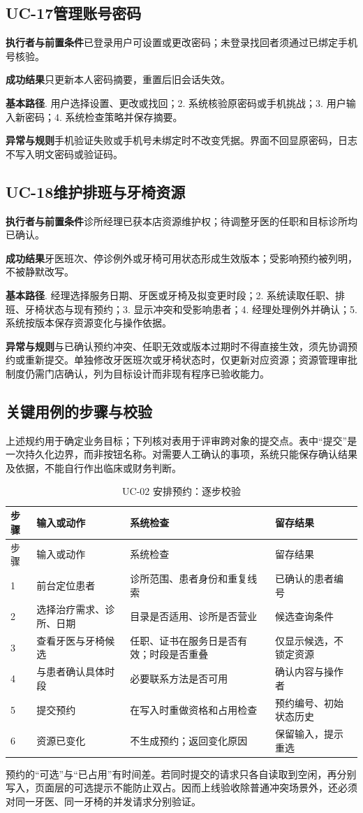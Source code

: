 \documentclass[12pt,a4paper,fontset=windows]{ctexart}
\newcommand{\spec}[6]{\Needspace{10\baselineskip}\subsection{#1\quad #2}
  \noindent\textbf{执行者与前置条件}\quad #3\par
  \noindent\textbf{成功结果}\quad #4\par
  \noindent\textbf{基本路径}\quad #5\par
  \noindent\textbf{异常与规则}\quad #6\par}
\begin{document}
\spec{UC-17}{管理账号密码}
{已登录用户可设置或更改密码；未登录找回者须通过已绑定手机号核验。}
{只更新本人密码摘要，重置后旧会话失效。}
{1. 用户选择设置、更改或找回；2. 系统核验原密码或手机挑战；3. 用户输入新密码；4. 系统检查策略并保存摘要。}
{手机验证失败或手机号未绑定时不改变凭据。界面不回显原密码，日志不写入明文密码或验证码。}

\spec{UC-18}{维护排班与牙椅资源}
{诊所经理已获本店资源维护权；待调整牙医的任职和目标诊所均已确认。}
{牙医班次、停诊例外或牙椅可用状态形成生效版本；受影响预约被列明，不被静默改写。}
{1. 经理选择服务日期、牙医或牙椅及拟变更时段；2. 系统读取任职、排班、牙椅状态与现有预约；3. 显示冲突和受影响患者；4. 经理处理例外并确认；5. 系统按版本保存资源变化与操作依据。}
{与已确认预约冲突、任职无效或版本过期时不得直接生效，须先协调预约或重新提交。单独修改牙医班次或牙椅状态时，仅更新对应资源；资源管理审批制度仍需门店确认，列为目标设计而非现有程序已验收能力。}

\subsection{关键用例的步骤与校验}
上述规约用于确定业务目标；下列核对表用于评审跨对象的提交点。表中“提交”是一次持久化边界，而非按钮名称。对需要人工确认的事项，系统只能保存确认结果及依据，不能自行作出临床或财务判断。

\begin{longtable}{@{}C{12mm}L{46mm}L{51mm}L{41mm}@{}}
\caption{UC-02 安排预约：逐步校验}\label{tab:booking-check}\\\toprule
步骤 & 输入或动作 & 系统检查 & 留存结果\\\midrule\endfirsthead
\toprule 步骤 & 输入或动作 & 系统检查 & 留存结果\\\midrule{} & 前台定位患者 & 诊所范围、患者身份和重复线索 & 已确认的患者编号\\
2 & 选择治疗需求、诊所、日期 & 目录是否适用、诊所是否营业 & 候选查询条件\\
3 & 查看牙医与牙椅候选 & 任职、证书在服务日是否有效；时段是否重叠 & 仅显示候选，不锁定资源\\
4 & 与患者确认具体时段 & 必要联系方法是否可用 & 确认内容与操作者\\
5 & 提交预约 & 在写入时重做资格和占用检查 & 预约编号、初始状态历史\\
6 & 资源已变化 & 不生成预约；返回变化原因 & 保留输入，提示重选\\
\bottomrule\end{longtable}

预约的“可选”与“已占用”有时间差。若同时提交的请求只各自读取到空闲，再分别写入，页面层的可选提示不能防止双占。因而上线验收除普通冲突场景外，还必须对同一牙医、同一牙椅的并发请求分别验证。
\end{document}
